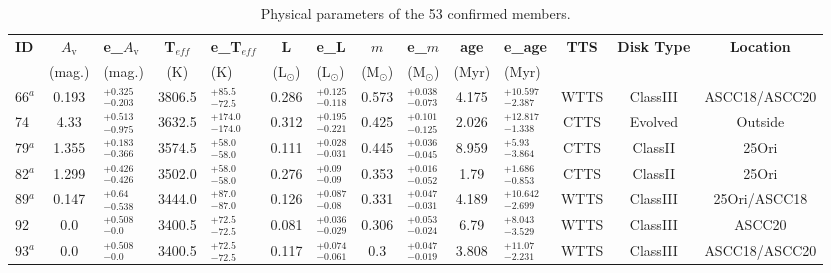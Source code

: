 \documentclass[12pt]{article}
\begin{document}
\begin{table} \scriptsize
 \caption[Physical parameters of the confirmed members using BOSS spectra]{Physical parameters of the 53 confirmed members.}
 \label{tab_BOSS:parameters}
 \begin{threeparttable}
  	\setlength{\tabcolsep}{5pt}
	\begin{tabular}{lclclclclclccc}
	\toprule
	{\bf ID} & {\bf $A_\textrm{v}$} & {\bf e\_$A_\textrm{v}$} &  {\bf T$_{eff}$}   & {\bf e\_T$_{eff}$}  & {\bf L}           & {\bf e\_L}          & {\bf $m$}         & {\bf e\_$m$}        & {\bf age}   & {\bf e\_age} & {\bf TTS} & {\bf Disk Type} & {\bf Location} \\
	   & (mag.)         & (mag.)          & (K)  & (K) & (L$_\odot$) & (L$_\odot$) & (M$_\odot$) & (M$_\odot$) & (Myr) & (Myr)              &     &           & \\
	\midrule
 	66$^a  $    & 0.193 & $^{+0.325}_{-0.203}$ & 3806.5 & $^{+85.5  }_{-72.5 }$ & 0.286 & $^{+0.125 }_{-0.118}$ & 0.573 & $^{+0.038 }_{-0.073}$ & 4.175  & $^{+10.597 }_{-2.387}$  & WTTS & ClassIII & ASCC18/ASCC20 \\
 	74          & 4.33  & $^{+0.513}_{-0.975}$ & 3632.5 & $^{+174.0 }_{-174.0}$ & 0.312 & $^{+0.195 }_{-0.221}$ & 0.425 & $^{+0.101 }_{-0.125}$ & 2.026  & $^{+12.817 }_{-1.338}$  & CTTS & Evolved  & Outside       \\
 	79$^a  $    & 1.355 & $^{+0.183}_{-0.366}$ & 3574.5 & $^{+58.0  }_{-58.0 }$ & 0.111 & $^{+0.028 }_{-0.031}$ & 0.445 & $^{+0.036 }_{-0.045}$ & 8.959  & $^{+5.93   }_{-3.864}$  & CTTS & ClassII  & 25Ori         \\
 	82$^a  $    & 1.299 & $^{+0.426}_{-0.426}$ & 3502.0 & $^{+58.0  }_{-58.0 }$ & 0.276 & $^{+0.09  }_{-0.09 }$ & 0.353 & $^{+0.016 }_{-0.052}$ & 1.79   & $^{+1.686  }_{-0.853}$  & CTTS & ClassII  & 25Ori         \\
 	89$^a  $    & 0.147 & $^{+0.64 }_{-0.538}$ & 3444.0 & $^{+87.0  }_{-87.0 }$ & 0.126 & $^{+0.087 }_{-0.08 }$ & 0.331 & $^{+0.047 }_{-0.031}$ & 4.189  & $^{+10.642 }_{-2.699}$  & WTTS & ClassIII & 25Ori/ASCC18  \\
 	92          & 0.0   & $^{+0.508}_{-0.0  }$ & 3400.5 & $^{+72.5  }_{-72.5 }$ & 0.081 & $^{+0.036 }_{-0.029}$ & 0.306 & $^{+0.053 }_{-0.024}$ & 6.79   & $^{+8.043  }_{-3.529}$  & WTTS & ClassIII & ASCC20        \\
 	93$^a  $    & 0.0   & $^{+0.508}_{-0.0  }$ & 3400.5 & $^{+72.5  }_{-72.5 }$ & 0.117 & $^{+0.074 }_{-0.061}$ & 0.3   & $^{+0.047 }_{-0.019}$ & 3.808  & $^{+11.07  }_{-2.231}$  & WTTS & ClassIII & ASCC18/ASCC20 \\

\end{tabular}
\end{threeparttable}
\end{table}
\end{document}
